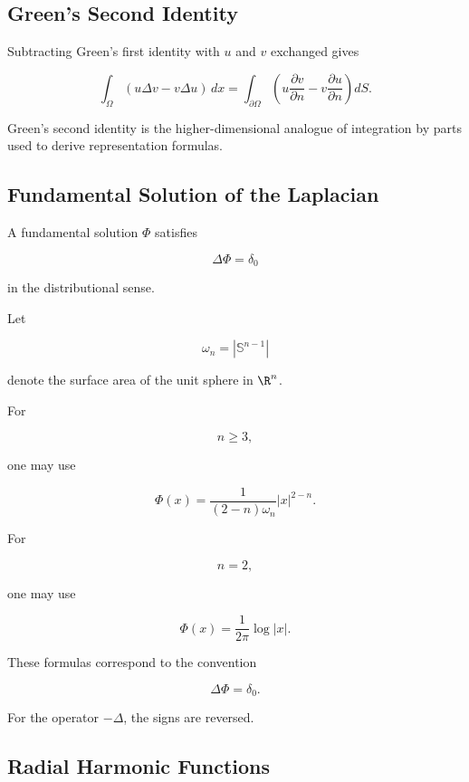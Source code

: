 \subsection{Green's Second Identity}
\label{subsec:greens-second-identity-potential}

Subtracting Green's first identity with \(u\) and \(v\) exchanged gives

\[
\boxed{
\int_\Omega
\left(
u\Delta v-v\Delta u
\right)\,dx
=
\int_{\partial\Omega}
\left(
u\frac{\partial v}{\partial n}
-
v\frac{\partial u}{\partial n}
\right)dS.
}
\]

Green's second identity is the higher-dimensional analogue of integration
by parts used to derive representation formulas.

\subsection{Fundamental Solution of the Laplacian}
\label{subsec:potential-fundamental-solution}

A fundamental solution \(\Phi\) satisfies

\[
\boxed{
\Delta\Phi=\delta_0
}
\]

in the distributional sense.

Let

\[
\omega_n
=
|\mathbb{S}^{n-1}|
\]

denote the surface area of the unit sphere in \(\R^n\).

For

\[
n\geq3,
\]

one may use

\[
\boxed{
\Phi(x)
=
\frac{1}{(2-n)\omega_n}
|x|^{2-n}.
}
\]

For

\[
n=2,
\]

one may use

\[
\boxed{
\Phi(x)
=
\frac{1}{2\pi}\log|x|.
}
\]

These formulas correspond to the convention

\[
\Delta\Phi=\delta_0.
\]

For the operator \(-\Delta\), the signs are reversed.

\subsection{Radial Harmonic Functions}
\label{subsec:radial-harmonic-functions}

